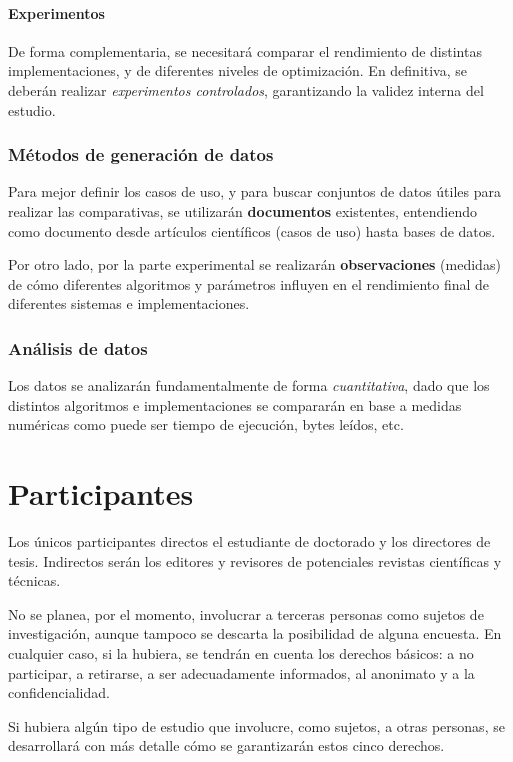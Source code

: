 \paragraph{Experimentos} De forma complementaria, se necesitará comparar
el rendimiento de distintas implementaciones, y de diferentes niveles de
optimización. En definitiva, se deberán realizar \emph{experimentos controlados},
garantizando la validez interna del estudio.

\subsubsection{Métodos de generación de datos}
Para mejor definir los casos de uso, y para buscar conjuntos de datos
útiles para realizar las comparativas, se utilizarán \textbf{documentos}
existentes, entendiendo como documento desde artículos científicos (casos de uso)
hasta bases de datos.

Por otro lado, por la parte experimental se realizarán \textbf{observaciones}
(medidas) de cómo diferentes algoritmos y parámetros influyen en el rendimiento
final de diferentes sistemas e implementaciones.

\subsubsection{Análisis de datos}
Los datos se analizarán fundamentalmente de forma \emph{cuantitativa}, dado
que los distintos algoritmos e implementaciones se compararán en base a
medidas numéricas como puede ser tiempo de ejecución, bytes leídos, etc.


\section{Participantes}
Los únicos participantes directos el estudiante de doctorado
y los directores de tesis. Indirectos serán los editores y revisores de
potenciales revistas científicas y técnicas.

No se planea, por el momento, involucrar a terceras personas como sujetos
de investigación, aunque tampoco se descarta la posibilidad de alguna encuesta.
En cualquier caso, si la hubiera, se tendrán en cuenta los derechos básicos\cite{Oates2006}:
a no participar, a retirarse, a ser adecuadamente informados, al anonimato
y a la confidencialidad.

Si hubiera algún tipo de estudio que involucre, como sujetos, a otras personas,
se desarrollará con más detalle cómo se garantizarán estos cinco derechos.

